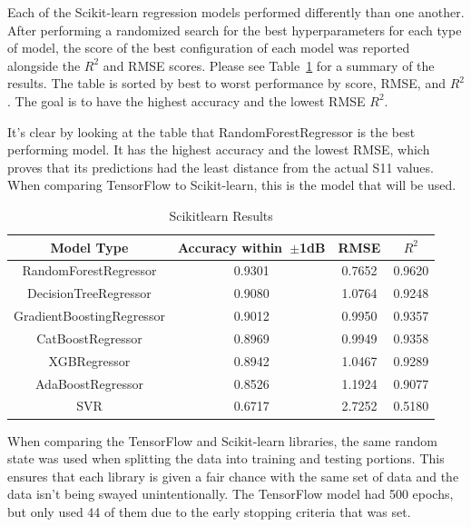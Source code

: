 \documentclass[lettersize,journal]{IEEEtran}
\begin{document}
Each of the Scikit-learn regression models performed differently than one another. After performing a randomized search for the best hyperparameters for each type of model, the score of the best configuration of each model was reported alongside the $R^2$ and RMSE scores. Please see Table~\ref{comparing_sklearn} for a summary of the results. The table is sorted by best to worst performance by score, RMSE, and $R^2$. The goal is to have the highest accuracy and the lowest RMSE $R^2$. 

It's clear by looking at the table that RandomForestRegressor is the best performing model. It has the highest accuracy and the lowest RMSE, which proves that its predictions had the least distance from the actual S11 values. When comparing TensorFlow to Scikit-learn, this is the model that will be used. 

\begin{table}[h]
\caption{Scikit\-learn Results}
\begin{center}
\begin{tabular}{ |c|c|c|c| }
    \hline
    Model Type & Accuracy within~$\pm$1dB & RMSE & $R^2$ \\ 
    \hline
    RandomForestRegressor & 0.9301 & 0.7652 & 0.9620 \\
    \hline  
    DecisionTreeRegressor & 0.9080 & 1.0764 & 0.9248 \\  
    \hline
    GradientBoostingRegressor & 0.9012 & 0.9950 & 0.9357 \\
    \hline
    CatBoostRegressor & 0.8969 & 0.9949 & 0.9358 \\    
    \hline
    XGBRegressor & 0.8942 & 1.0467 & 0.9289 \\  
    \hline
    AdaBoostRegressor & 0.8526 & 1.1924 & 0.9077 \\  
    \hline
    SVR & 0.6717 & 2.7252 & 0.5180 \\  
    \hline
\end{tabular}
\end{center}
\label{comparing_sklearn}
\end{table}

When comparing the TensorFlow and Scikit-learn libraries, the same random state was used when splitting the data into training and testing portions. This ensures that each library is given a fair chance with the same set of data and the data isn't being swayed unintentionally. The TensorFlow model had 500 epochs, but only used 44 of them due to the early stopping criteria that was set. 
\end{document}

